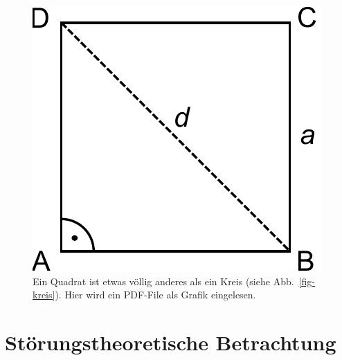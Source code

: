 \begin{figure}[h]
\includegraphics[width=\smallfigwidth]{img/quadrat.pdf}
\caption{Ein Quadrat ist etwas völlig anderes als ein Kreis (siehe Abb.\ \ref{fig-kreis}). 
Hier wird ein PDF-File als Grafik eingelesen.}
\label{fig-quadrat}
\end{figure} 



\section{Störungstheoretische Betrachtung}
